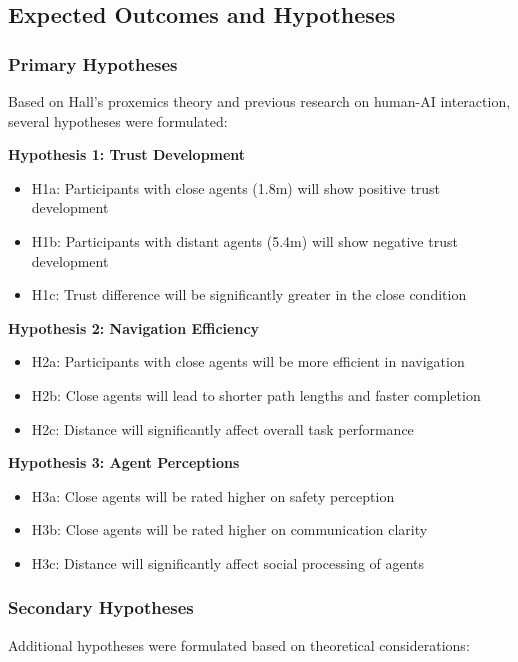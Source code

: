 \documentclass[12pt]{article}
\begin{document}
\subsection{Expected Outcomes and Hypotheses}

\subsubsection{Primary Hypotheses}

Based on Hall's proxemics theory and previous research on human-AI interaction, several hypotheses were formulated:

\textbf{Hypothesis 1: Trust Development}
\begin{itemize}
    \item H1a: Participants with close agents (1.8m) will show positive trust development
    \item H1b: Participants with distant agents (5.4m) will show negative trust development
    \item H1c: Trust difference will be significantly greater in the close condition
\end{itemize}

\textbf{Hypothesis 2: Navigation Efficiency}
\begin{itemize}
    \item H2a: Participants with close agents will be more efficient in navigation
    \item H2b: Close agents will lead to shorter path lengths and faster completion
    \item H2c: Distance will significantly affect overall task performance
\end{itemize}

\textbf{Hypothesis 3: Agent Perceptions}
\begin{itemize}
    \item H3a: Close agents will be rated higher on safety perception
    \item H3b: Close agents will be rated higher on communication clarity
    \item H3c: Distance will significantly affect social processing of agents
\end{itemize}

\subsubsection{Secondary Hypotheses}

Additional hypotheses were formulated based on theoretical considerations:
\end{document}
